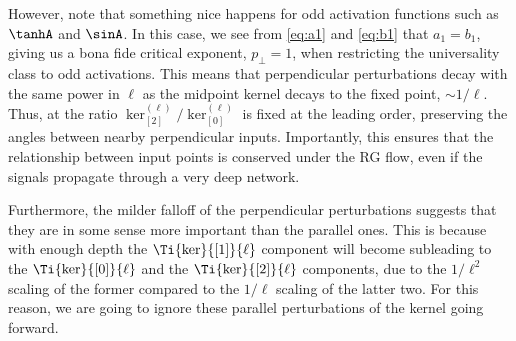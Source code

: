 However, note that something nice happens for odd activation functions such as $\tanhA$ and $\sinA$. In this case, we see from \eqref{eq:a1} and \eqref{eq:b1} that $a_1 = b_1$, giving us a bona fide critical exponent, $p_\perp = 1$, when restricting the universality class to odd activations. This means that perpendicular perturbations decay with the same power in $\ell$ as the midpoint kernel decays to the fixed point, $\sim 1/\ell$. Thus, at  the ratio $ \ker_{[2]}^{(\ell)} / \ker_{[0]}^{(\ell)}$ is fixed at the leading order, preserving the angles between nearby perpendicular inputs. Importantly, this ensures that the relationship between input points is conserved under the RG flow, even if the signals propagate through a very deep network.

Furthermore, the milder falloff of the perpendicular perturbations suggests that they are in some sense more important than the parallel ones. 
This is because with enough depth the $\Ti{\ker}{[1]}{\ell}$ component will become subleading to the $\Ti{\ker}{[0]}{\ell}$ and the $\Ti{\ker}{[2]}{\ell}$ components, due to the $1/\ell^2$ scaling of the former compared to the $1/\ell$ scaling of the latter two.
For this reason, we are going to
ignore these parallel perturbations of the kernel going forward.


